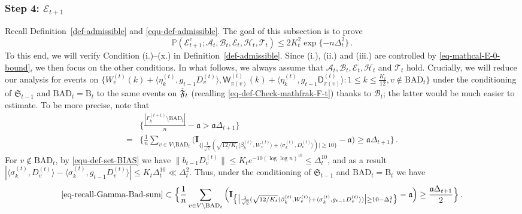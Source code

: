 \documentclass[11pt]{article}
\numberwithin{equation}{section}
\begin{document}
\subsubsection{Step 4: $\mathcal{E}_{t+1}$}
Recall Definition~\ref{def-admissible} and \eqref{equ-def-admissible}.
The goal of this subsection is to prove
\begin{equation}\label{equ-mathcal-E-t+1-holds}
    \mathbb{P}( \mathcal{E}_{t+1}^{c}; \mathcal{A}_{t}, \mathcal{B}_{t}, \mathcal{E}_{t}, \mathcal{H}_{t}, \mathcal{T}_{t} ) \leq 2 K_t^2 \exp \{ - n \Delta_t^2 \} \,.
\end{equation}
To this end, we will verify Condition (i.)--(x.) in Definition~\ref{def-admissible}. Since (i.), (ii.) and (iii.) are controlled by \eqref{eq-mathcal-E-0-bound}, we then focus on the other conditions. In what follows, we always assume that $\mathcal A_{t}, \mathcal B_{t}, \mathcal{E}_{t}, \mathcal{H}_t$ and $\mathcal{T}_t$ hold. 
Crucially, we will reduce our analysis for events on 
$\{  W^{(t)}_v (k)+ \langle \eta^{(t)}_k, g_{t-1}{D}^{(t)}_v \rangle,  \mathsf W^{(t)}_{\pi(v)}(k)+ \langle \eta^{(t)}_k, g_{t-1}\mathsf{D}^{(t)}_{\pi(v)} \rangle : 1 \leq k \leq \frac{K_t}{12}, v \not \in \mathrm{BAD}_{t} \}$ under the conditioning of $\mathfrak{S}_{t-1}$ and $\mathrm{BAD}_t = \mathrm{B}_t$ to the same events on $\Check{\mathfrak F}_t$ (recalling \eqref{eq-def-Check-mathfrak-F-t}) thanks to $\mathcal B_t$; the latter would be much easier to estimate. To be more precise, note that
\begin{align}
    & \Big\{ \frac{|\Gamma^{(t+1)}_k \setminus \mathrm{BAD}_{t} |}{n} - \mathfrak{a} > \mathfrak{a} \Delta_{t+1} \Big\} \label{eq-recall-Gamma-Bad-sum} \\
    = & \Big\{ \frac{1}{n} \sum_{v \in V \setminus \mathrm{BAD}_{t}} \Big( \mathbf{I}_{ \big\{ \big| \frac{1}{\sqrt{2}} ( \sqrt{12/K_t} \langle \beta^{(t)}_k, W^{(t)}_v \rangle + \langle \sigma^{(t)}_k, D^{(t)}_v \rangle ) \big| \geq 10  \big\} } - \mathfrak{a} \Big) \geq \mathfrak{a} \Delta_{t+1} \Big\} \,. \nonumber
\end{align}
For $v \not \in \mathrm{BAD}_t$, by \eqref{equ-def-set-BIAS} we have $\| b_{t-1}{D}^{(t)}_v \| \leq K_t e^{-10 (\log \log n)^{10} } \leq \Delta_t^{10}$, and as a result $|\langle \sigma^{(t)}_k, D^{(t)}_v \rangle - \langle \sigma^{(t)}_k, g_{t-1}{D}^{(t)}_v \rangle| \leq K_t \Delta_t^{10} \ll \Delta_t^2$. Thus,  under the conditioning of $\mathfrak{S}_{t-1}$ and $\mathrm{BAD}_t = \mathrm{B}_t$ we have 
\begin{align*}
\eqref{eq-recall-Gamma-Bad-sum}  \subset \Big\{ \frac{1}{n} \sum_{v \in V \setminus \mathrm{BAD}_{t}} \Big( \mathbf{I}_{ \big\{ \big| \frac{1}{\sqrt{2}} ( \sqrt{12/K_t} \langle \beta^{(t)}_k, W^{(t)}_v \rangle + \langle \sigma^{(t)}_k, g_{t-1}{D}^{(t)}_v \rangle ) \big| \geq 10 - \Delta_{t}^2  \big\} } - \mathfrak{a} \Big) \geq \frac{\mathfrak{a} \Delta_{t+1}}{2} \Big\} \,.
\end{align*}
\end{document}
